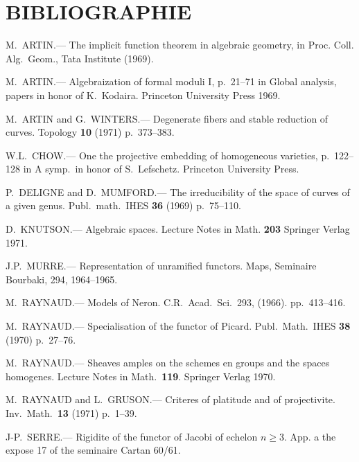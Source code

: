 \documentclass[12pt,a4paper]{article}
\theoremstyle{plain}
\theoremstyle{definition}
\theoremstyle{remark}
\begin{document}
\section*{BIBLIOGRAPHIE}

\begin{enumerate}[label={[\arabic*]},leftmargin=2em]
\item M.~ARTIN.--- The implicit function theorem in algebraic geometry, in Proc. Coll. Alg.~Geom., Tata Institute (1969).

\item M.~ARTIN.--- Algebraization of formal moduli I, p.~21--71 in Global analysis, papers in honor of K.~Kodaira. Princeton University Press 1969.

\item M.~ARTIN and G.~WINTERS.--- Degenerate fibers and stable reduction of curves. Topology \textbf{10} (1971) p.~373--383.

\item W.L.~CHOW.--- One the projective embedding of homogeneous varieties, p.~122--128 in A symp.~in honor of S.~Lefschetz. Princeton University Press.

\item P.~DELIGNE and D.~MUMFORD.--- The irreducibility of the space of curves of a given genus. Publ.~math.~IHES \textbf{36} (1969) p.~75--110.

\item D.~KNUTSON.--- Algebraic spaces. Lecture Notes in Math. \textbf{203} Springer Verlag 1971.

\item J.P.~MURRE.--- Representation of unramified functors. Maps, Seminaire Bourbaki, 294, 1964--1965.

\item M.~RAYNAUD.--- Models of Neron. C.R.~Acad.~Sci.~293, (1966). pp.~413--416.

\item M.~RAYNAUD.--- Specialisation of the functor of Picard. Publ.~Math.~IHES \textbf{38} (1970) p.~27--76.

\item M.~RAYNAUD.--- Sheaves amples on the schemes en groups and the spaces homogenes. Lecture Notes in Math.~\textbf{119}. Springer Verlag 1970.

\item M.~RAYNAUD and L.~GRUSON.--- Criteres of platitude and of projectivite. Inv.~Math.~\textbf{13} (1971) p.~1--39.

\item J-P.~SERRE.--- Rigidite of the functor of Jacobi of echelon $n \geq 3$. App. a the expose 17 of the seminaire Cartan 60/61.
\end{enumerate}
\end{document}
